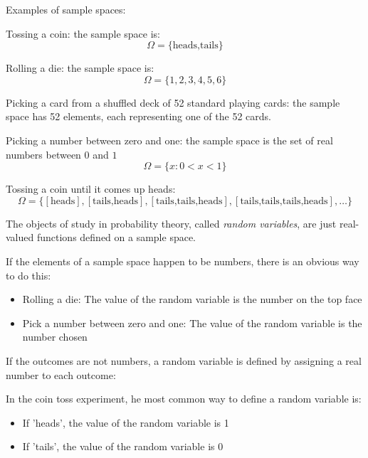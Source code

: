 Examples of sample spaces:
\par\vspace{0.5 cm}
Tossing a coin: the sample space is:
\[
\Omega = \{\mbox{heads,tails}\}
\]
\par\vspace{0.5 cm}
Rolling a die: the sample space is:
\[
\Omega = \{1,2,3,4,5,6\}
\]
\par\vspace{0.5 cm}
Picking a card from a shuffled deck of 52 standard playing cards: the sample space has 52 elements, each representing one of the 52 cards.
\par\vspace{0.5 cm}
Picking a number between zero and one: the sample space is the set of real numbers between $0$ and $1$
\[
\Omega = \{x : 0 < x < 1\}
\]
\par\vspace{0.5 cm}
Tossing a coin until it comes up heads:
\[
\Omega = \{[\mbox{heads}],[\mbox{tails,heads}],[\mbox{tails,tails,heads}],[\mbox{tails,tails,tails,heads}],\ldots\}
\]
\par\vspace{0.5 cm}
The objects of study in probability theory, called \textit{random variables}, are just real-valued functions defined on a sample space.
\par\vspace{0.5 cm}
If the elements of a sample space happen to be numbers, there is an obvious way to do this:
\par\vspace{0.5 cm}
\begin{itemize}
\item Rolling a die: The value of the random variable is the number on the top face
\item Pick a number between zero and one: The value of the random variable is the number chosen
\end{itemize}
\par\vspace{0.5 cm}
If the outcomes are not numbers, a random variable is defined by assigning a real number to each outcome:
\par\vspace{0.5 cm}
In the coin toss experiment, he most common way to define a random variable is:
\par\vspace{0.5 cm}
\begin{itemize}
\item If 'heads', the value of the random variable is 1
\item If 'tails', the value of the random variable is 0
\end{itemize}
